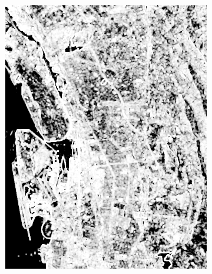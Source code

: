 \begin{figure}
	\begin{subfigure}[t]{0.4\columnwidth}
	\centering
	\includegraphics[width = \columnwidth]{Figures/IGRASS15_WORK/alpha_5_5}
	\caption{}
	 \end{subfigure}%
	    ~ 
	 \begin{subfigure}[t]{0.4\columnwidth}
	 \centering

\end{subfigure}
\end{figure}
